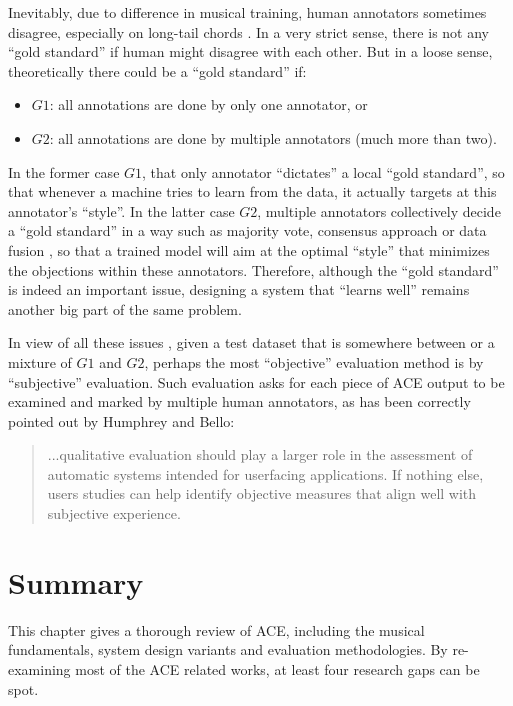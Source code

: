 Inevitably, due to difference in musical training, human annotators sometimes disagree, especially on long-tail chords \cite{humphreyfour}. In a very strict sense, there is not any ``gold standard'' if human might disagree with each other. But in a loose sense, theoretically there could be a ``gold standard'' if:
\begin{itemize}
\item $G1$: all annotations are done by only one annotator, or
\item $G2$: all annotations are done by multiple annotators (much more than two).
\end{itemize}
In the former case $G1$, that only annotator ``dictates'' a local ``gold standard'', so that whenever a machine tries to learn from the data, it actually targets at this annotator's ``style''. In the latter case $G2$, multiple annotators collectively decide a ``gold standard'' in a way such as majority vote, consensus approach \cite{ni2013understanding} or data fusion \cite{koopsintegration,klein2004sensor}, so that a trained model will aim at the optimal ``style'' that minimizes the objections within these annotators. Therefore, although the ``gold standard'' is indeed an important issue, designing a system that ``learns well'' remains another big part of the same problem.

In view of all these issues \cite{humphreyfour,ni2013understanding}, given a test dataset that is somewhere between or a mixture of $G1$ and $G2$, perhaps the most ``objective'' evaluation method is by ``subjective'' evaluation. Such evaluation asks for each piece of ACE output to be examined and marked by multiple human annotators, as has been correctly pointed out by Humphrey and Bello:
\begin{quote}
...qualitative evaluation should play a larger role in the assessment of automatic systems intended for userfacing applications. If nothing else, users studies can help identify objective measures that align well with subjective experience.
\end{quote}

\section{Summary} \label{sec:2-summary}
This chapter gives a thorough review of ACE, including the musical fundamentals, system design variants and evaluation methodologies. By re-examining most of the ACE related works, at least four research gaps can be spot.

